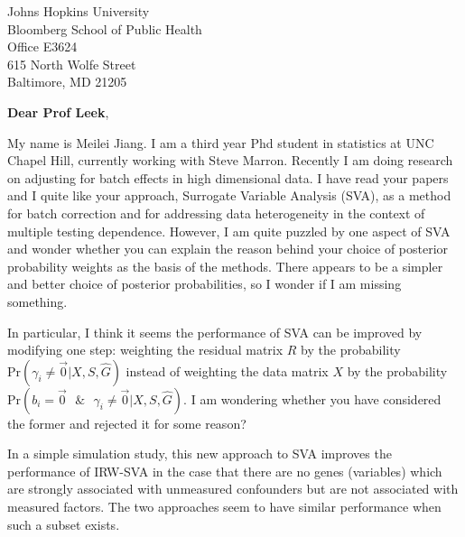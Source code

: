 \documentclass{letter}
\begin{document}

\begin{letter}{Johns Hopkins University \\
                     Bloomberg School of Public Health \\ 
                     Office E3624 \\ 
                     615 North Wolfe Street  \\ 
                     Baltimore, MD 21205} %


\opening{\textbf{Dear Prof Leek},}
 
My name is Meilei Jiang. I am a third year Phd student in statistics at UNC Chapel Hill, currently working with Steve Marron. Recently I am doing research on adjusting for batch effects in high dimensional data. I have read your papers and I quite like your approach, Surrogate Variable Analysis (SVA), as a method for batch correction and for addressing data heterogeneity in the context of multiple testing dependence. However, I am quite puzzled by one aspect of SVA and wonder whether you can explain the reason behind your choice of posterior probability weights as the basis of the methods. There appears to be a simpler and better choice of posterior probabilities, so I wonder if I am missing something.

In particular, I think it seems the performance of SVA can be improved by modifying one step: weighting the residual matrix $R$ by the probability $\text{Pr}( \gamma_i \neq \vec{0}| X, S, \hat{G})$ instead of weighting the data matrix $X$ by the probability $\text{Pr}(b_i = \vec{0} \text{ } \& \text{ } \gamma_i \neq \vec{0} | X, S, \hat{G})$. I am wondering whether you have considered the former and rejected it for some reason?

In a simple simulation study, this new approach to SVA improves the performance of IRW-SVA in the case that there are no genes (variables) which are strongly associated with unmeasured confounders but are not associated with measured factors. The two approaches seem to have similar performance when such a subset exists. 


\end{letter}
\end{document}
